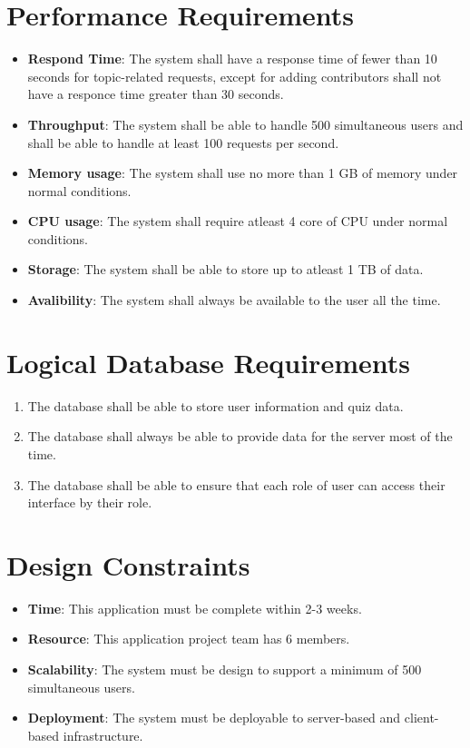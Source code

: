 \documentclass[ 10pt]{report}
\begin{document}
        \section{Performance Requirements}
        \begin{itemize}
        \item \textbf{Respond Time}: The system shall have a response time of fewer than 10 seconds for topic-related requests, except for adding contributors shall not have a responce time greater than 30 seconds.  
        \item \textbf{Throughput}: The system shall be able to handle 500 simultaneous users and shall be able to handle at least 100 requests per second.
        \item \textbf{Memory usage}: The system shall use no more than 1 GB of memory under normal conditions. 
        \item \textbf{CPU usage}: The system shall require atleast 4 core of CPU under normal conditions.
        \item \textbf{Storage}: The system shall be able to store up to atleast 1 TB of data.
        \item \textbf{Avalibility}: The system shall always be available to the user all the time.
        \end{itemize}
        \section{Logical Database Requirements}
        \begin{enumerate}
            \item The database shall be able to store user information and quiz data.
            \item The database shall always be able to provide data for the server most of the time.
            \item The database shall be able to ensure that each role of user can access their interface by their role.
        \end{enumerate}
        \section{Design Constraints}
        \begin{itemize}
        \item \textbf{Time}: This application must be complete within 2-3 weeks.
        \item \textbf{Resource}: This application project team has 6 members.
        \item \textbf{Scalability}: The system must be design to support a minimum of 500 simultaneous users.
        \item \textbf{Deployment}: The system must be deployable to server-based and client-based infrastructure.
        \end{itemize}
\end{document}
